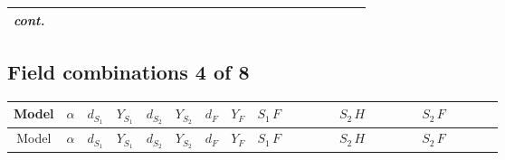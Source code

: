 \documentclass[8pt]{article}
\begin{document}
\begin{landscape}
\begin{longtable}{@{}cccccccc >{\raggedright\arraybackslash}p{0.21\linewidth} >{\raggedright\arraybackslash}p{0.21\linewidth} >{\raggedright\arraybackslash}p{0.21\linewidth}@{}}
\textit{cont.} &  &  &  &  &  &  &  &  &  & \scriptsize\adjustbox{max width=\linewidth}{$\begin{gathered} -\frac{2 \hbar  \overline{y_{2,i_1,r_1}} S_{1,j_3} S_{2,j_4} y_{2,i_1,r_1} S_{1,j_1}{}^{\dagger } S_{2,j_2}{}^{\dagger } \mathcal{I}_{12,j_1,j_3,j_2,j_4}{}^3 \lambda_{12}^{(1)}^{(3)}}{\sqrt{3} \epsilon } \\ -\frac{\hbar  \overline{y_{2,i_1,r_1}} S_{1,j_3} S_{2,j_4} y_{2,i_1,r_1} S_{1,j_1}{}^{\dagger } S_{2,j_2}{}^{\dagger } \mathcal{I}_{12,j_1,j_3,j_2,j_4}{}^3 \lambda_{12}^{(1)}^{(3)}}{\sqrt{3}}\end{gathered}$} \\
\midrule
\bottomrule
\end{longtable}
\clearpage
\subsection*{Field combinations 4 of 8}
\begin{longtable}{@{}cccccccc >{\raggedright\arraybackslash}p{0.21\linewidth} >{\raggedright\arraybackslash}p{0.21\linewidth} >{\raggedright\arraybackslash}p{0.21\linewidth}@{}}
\toprule
Model & $\alpha$ & $d_{S_1}$ & $Y_{S_1}$ & $d_{S_2}$ & $Y_{S_2}$ & $d_F$ & $Y_F$ & $S_1\,F$ & $S_2\,H$ & $S_2\,F$ \\
\midrule
\endfirsthead
\toprule
Model & $\alpha$ & $d_{S_1}$ & $Y_{S_1}$ & $d_{S_2}$ & $Y_{S_2}$ & $d_F$ & $Y_F$ & $S_1\,F$ & $S_2\,H$ & $S_2\,F$ \\
\midrule
\endhead

\end{longtable}
\end{landscape}
\end{document}
